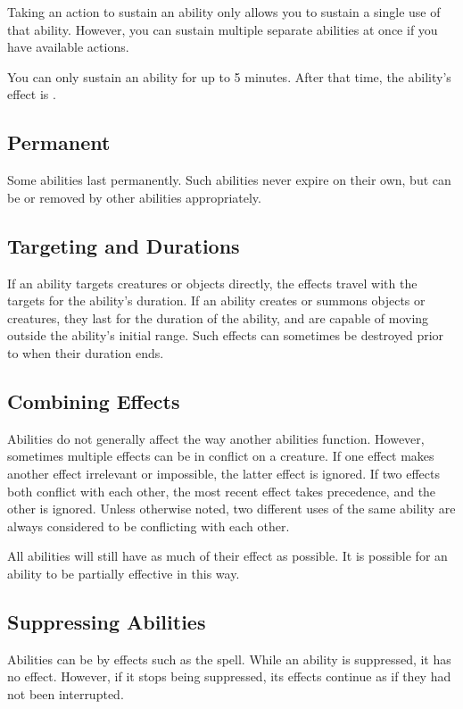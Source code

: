             Taking an action to sustain an ability only allows you to sustain a single use of that ability.
            However, you can sustain multiple separate abilities at once if you have available actions.

            You can only sustain an ability for up to 5 minutes.
            After that time, the ability's effect is .

        \subsection{Permanent}
            Some abilities last permanently.
            Such abilities never expire on their own, but can be  or removed by other abilities appropriately.

        \subsection{Targeting and Durations}
            If an ability targets creatures or objects directly, the effects travel with the targets for the ability's duration.
            If an ability creates or summons objects or creatures, they last for the duration of the ability, and are capable of moving outside the ability's initial range.
            Such effects can sometimes be destroyed prior to when their duration ends.

    \subsection{Combining Effects}
        Abilities do not generally affect the way another abilities function.
        However, sometimes multiple effects can be in conflict on a creature.
        If one effect makes another effect irrelevant or impossible, the latter effect is ignored.
        If two effects both conflict with each other, the most recent effect takes precedence, and the other is ignored.
        Unless otherwise noted, two different uses of the same ability are always considered to be conflicting with each other.

        All abilities will still have as much of their effect as possible.
        It is possible for an ability to be partially effective in this way.

    \subsection{Suppressing Abilities}\label{Suppressing Abilities}
        Abilities can be  by effects such as the  spell.
        While an ability is suppressed, it has no effect.
        However, if it stops being suppressed, its effects continue as if they had not been interrupted.

